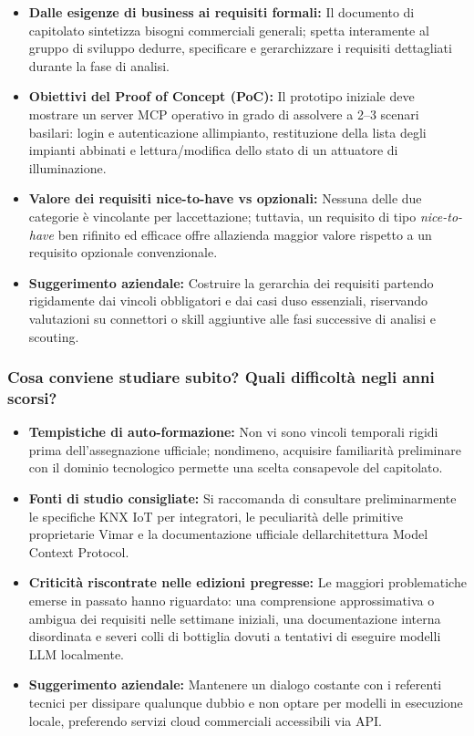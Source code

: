 \documentclass[12pt,a4paper]{article}
\newcommand{\tightlist}{\setlength{\itemsep}{1pt}\setlength{\parskip}{0pt}}
\begin{document}
\begin{itemize}
\tightlist
\item \textbf{Dalle esigenze di business ai requisiti formali:} Il documento di capitolato sintetizza bisogni commerciali generali; spetta interamente al gruppo di sviluppo dedurre, specificare e gerarchizzare i requisiti dettagliati durante la fase di analisi.
\item \textbf{Obiettivi del Proof of Concept (PoC):} Il prototipo iniziale deve mostrare un server MCP operativo in grado di assolvere a 2–3 scenari basilari: login e autenticazione all\textquotesingle impianto, restituzione della lista degli impianti abbinati e lettura/modifica dello stato di un attuatore di illuminazione.
\item \textbf{Valore dei requisiti nice-to-have vs opzionali:} Nessuna delle due categorie è vincolante per l\textquotesingle accettazione; tuttavia, un requisito di tipo \emph{nice-to-have} ben rifinito ed efficace offre all\textquotesingle azienda maggior valore rispetto a un requisito opzionale convenzionale.
\item \textbf{Suggerimento aziendale:} Costruire la gerarchia dei requisiti partendo rigidamente dai vincoli obbligatori e dai casi d\textquotesingle uso essenziali, riservando valutazioni su connettori o skill aggiuntive alle fasi successive di analisi e scouting.
\end{itemize}

\hypertarget{cosa-conviene-studiare-subito-quali-difficoltuxe0-negli-anni-scorsi}{%
\subsubsection{\texorpdfstring{Cosa conviene studiare subito? Quali difficoltà negli anni scorsi?}{Cosa conviene studiare subito? Quali difficoltà negli anni scorsi?}}}

\begin{itemize}
\tightlist
\item \textbf{Tempistiche di auto-formazione:} Non vi sono vincoli temporali rigidi prima dell'assegnazione ufficiale; nondimeno, acquisire familiarità preliminare con il dominio tecnologico permette una scelta consapevole del capitolato.
\item \textbf{Fonti di studio consigliate:} Si raccomanda di consultare preliminarmente le specifiche KNX IoT per integratori, le peculiarità delle primitive proprietarie Vimar e la documentazione ufficiale dell\textquotesingle architettura Model Context Protocol.
\item \textbf{Criticità riscontrate nelle edizioni pregresse:} Le maggiori problematiche emerse in passato hanno riguardato: una comprensione approssimativa o ambigua dei requisiti nelle settimane iniziali, una documentazione interna disordinata e severi colli di bottiglia dovuti a tentativi di eseguire modelli LLM localmente.
\item \textbf{Suggerimento aziendale:} Mantenere un dialogo costante con i referenti tecnici per dissipare qualunque dubbio e non optare per modelli in esecuzione locale, preferendo servizi cloud commerciali accessibili via API.
\end{itemize}
\end{document}
